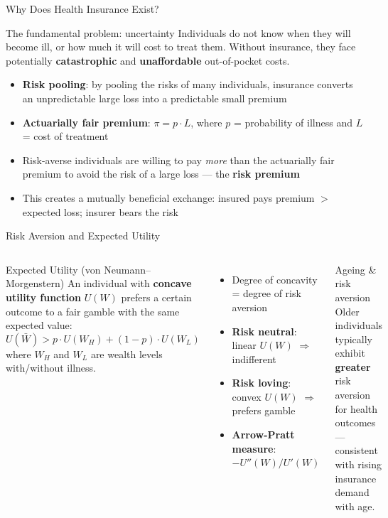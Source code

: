 \documentclass[aspectratio=169, 12pt]{beamer}
\begin{document}
\begin{frame}{Why Does Health Insurance Exist?}
  \begin{block}{The fundamental problem: uncertainty}
    Individuals do not know when they will become ill, or how much it will cost to treat them.
    Without insurance, they face potentially \textbf{catastrophic} and \textbf{unaffordable}
    out-of-pocket costs.
  \end{block}
  \begin{itemize}
    \item \textbf{Risk pooling}: by pooling the risks of many individuals, insurance converts
          an unpredictable large loss into a predictable small premium
    \item \textbf{Actuarially fair premium}: $\pi = p \cdot L$, where $p$ = probability of
          illness and $L$ = cost of treatment
    \item Risk-averse individuals are willing to pay \emph{more} than the actuarially fair
          premium to avoid the risk of a large loss --- the \textbf{risk premium}
    \item This creates a mutually beneficial exchange: insured pays premium $>$ expected loss;
          insurer bears the risk
  \end{itemize}
\end{frame}

\begin{frame}{Risk Aversion and Expected Utility}
  \begin{columns}
      \begin{block}{Expected Utility (von Neumann--Morgenstern)}
        An individual with \textbf{concave utility function} $U(W)$ prefers a certain outcome
        to a fair gamble with the same expected value:
        $$U(\bar{W}) > p \cdot U(W_H) + (1-p) \cdot U(W_L)$$
        where $W_H$ and $W_L$ are wealth levels with/without illness.
      \end{block}
      \begin{itemize}
        \item Degree of concavity = degree of risk aversion
        \item \textbf{Risk neutral}: linear $U(W)$ $\Rightarrow$ indifferent
        \item \textbf{Risk loving}: convex $U(W)$ $\Rightarrow$ prefers gamble
        \item \textbf{Arrow-Pratt measure}: $-U''(W)/U'(W)$
      \end{itemize}
      \begin{alertblock}{Ageing \& risk aversion}
        Older individuals typically exhibit \textbf{greater} risk aversion for health outcomes ---
        consistent with rising insurance demand with age.
      \end{alertblock}
  \end{columns}
\end{frame}
\end{document}

